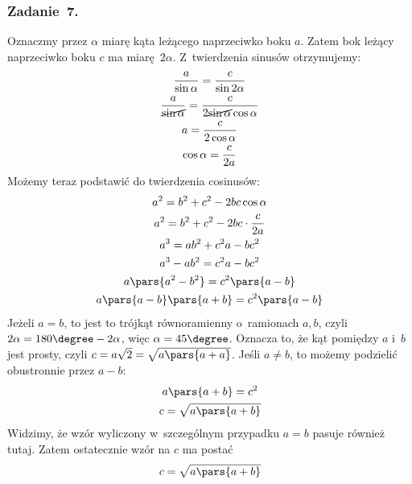 \subsubsection*{Zadanie~7.}
Oznaczmy przez \(\alpha\) miarę kąta leżącego naprzeciwko boku \(a\). Zatem bok leżący naprzeciwko boku \(c\) ma miarę \(2\alpha\). Z~twierdzenia sinusów otrzymujemy:
\begin{gather*}
    \frac{a}{\sin\alpha} = \frac{c}{\sin2\alpha}\\
    \frac{a}{\cancel{\sin\alpha}} = \frac{c}{2\cancel{\sin\alpha}\cos\alpha}\\
    a = \frac{c}{2\cos\alpha}\\
    \cos\alpha = \frac{c}{2a}
\end{gather*}
Możemy teraz podstawić do twierdzenia cosinusów:
\begin{gather*}
    a^2 = b^2 + c^2 - 2bc\cos\alpha\\
    a^2 = b^2 + c^2 - 2bc \cdot \frac{c}{2a}\\
    a^3 = ab^2 + c^2a - bc^2\\
    a^3 - ab^2 = c^2a - bc^2\\
    a\pars{a^2 - b^2} = c^2\pars{a - b}\\
    a\pars{a - b}\pars{a + b} = c^2\pars{a - b}
\end{gather*}
Jeżeli \(a = b\), to jest to trójkąt równoramienny o~ramionach \(a, b\), czyli~\(2\alpha = 180\degree - 2\alpha\), więc \(\alpha = 45\degree\). Oznacza to, że kąt pomiędzy \(a\) i~\(b\) jest prosty, czyli \(c = a\sqrt{2} = \sqrt{a\pars{a + a}}\). Jeśli \(a \neq b\), to możemy podzielić obustronnie przez \(a - b\):
\begin{gather*}
    a\pars{a + b} = c^2\\
    c = \sqrt{a\pars{a + b}}
\end{gather*}
Widzimy, że wzór wyliczony w~szczególnym przypadku \(a = b\) pasuje również tutaj. Zatem ostatecznie wzór na \(c\) ma postać
\begin{equation*}
    c = \sqrt{a\pars{a + b}}
\end{equation*}
